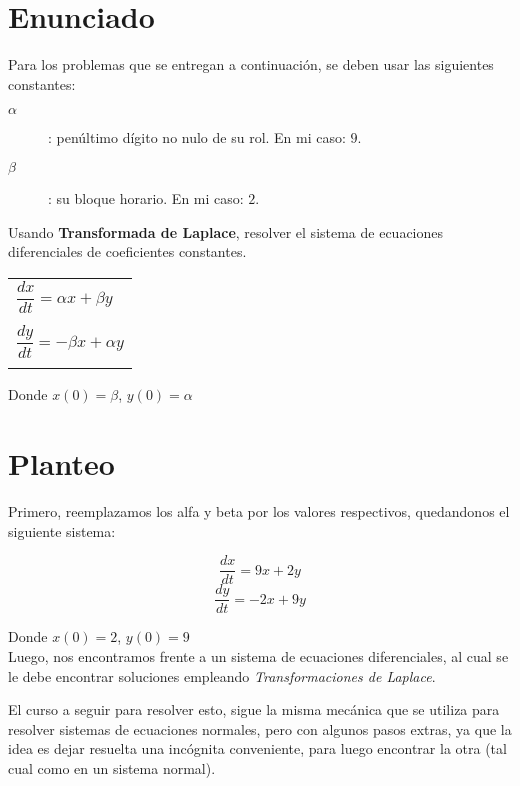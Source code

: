 \documentclass[12pt,letterpaper]{article}
\begin{document}
\section{Enunciado}
Para los problemas que se entregan a continuación, se deben usar las siguientes constantes:
\begin{description}
\item[$\alpha$] : penúltimo dígito no nulo de su rol. En mi caso: $9$.
\item[$\beta$] : su bloque horario. En mi caso: $2$. 
\end{description}

Usando \textbf{Transformada de Laplace}, resolver el sistema de ecuaciones diferenciales de coeficientes constantes.

\begin{center}
	\begin{tabular}{ p{3.5cm} |}
	$\dfrac{dx}{dt} = \alpha x + \beta y$ \\
	\smallskip \\
	$\dfrac{dy}{dt} = -\beta x + \alpha y$ \\
	\smallskip \\
	\hline
	\end{tabular}
\end{center}

Donde $x(0)=\beta$, $y(0)=\alpha$

\section{Planteo}
Primero, reemplazamos los alfa y beta por los valores respectivos, quedandonos el siguiente sistema:

\begin{equation}\dfrac{dx}{dt} = 9 x + 2 y\end{equation}
\begin{equation}\dfrac{dy}{dt} = -2 x + 9 y\end{equation}

Donde $x(0)=2$, $y(0)=9$ \\

Luego, nos encontramos frente a un sistema de ecuaciones diferenciales, al cual se le debe encontrar soluciones empleando \textit{Transformaciones de Laplace}.

El curso a seguir para resolver esto, sigue la misma mecánica que se utiliza para resolver sistemas de ecuaciones normales, pero con algunos pasos extras, ya que la idea es dejar resuelta una incógnita conveniente, para luego encontrar la otra (tal cual como en un sistema normal).
\end{document}
